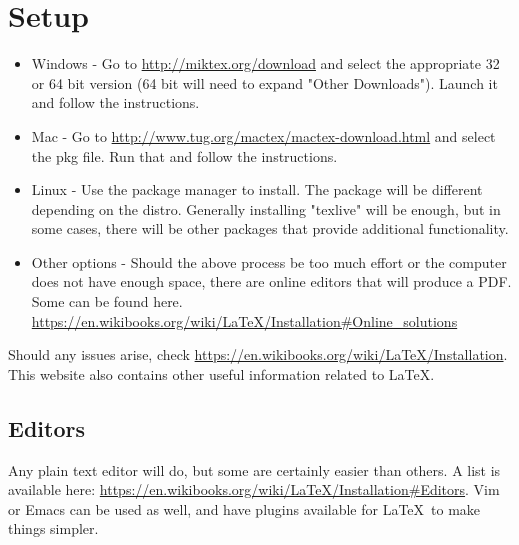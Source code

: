 \documentclass[11pt]{article}
\begin{document}
\section*{Setup}
\begin{itemize} 
    \item Windows - Go to \url{http://miktex.org/download} and select the appropriate 32 or 64 bit version (64 bit will need to expand "Other Downloads"). Launch it and follow the instructions.

    \item Mac - Go to \url{http://www.tug.org/mactex/mactex-download.html} and select the pkg file. Run that and follow the instructions. 

    \item Linux - Use the package manager to install. The package will be different depending on the distro. Generally installing "texlive" will be enough, but in some cases, there will be other packages that provide additional functionality. 

    \item Other options - Should the above process be too much effort or the computer does not have enough space, there are online editors that will produce a PDF. Some can be found here. \url{https://en.wikibooks.org/wiki/LaTeX/Installation#Online_solutions} 


\end{itemize}
        Should any issues arise, check \url{https://en.wikibooks.org/wiki/LaTeX/Installation}. This website also contains other useful information related to \LaTeX.

\subsection*{Editors}
Any plain text editor will do, but some are certainly easier than others. A list is available here: \url{https://en.wikibooks.org/wiki/LaTeX/Installation#Editors}. Vim or Emacs can be used as well, and have plugins available for \LaTeX\ to make things simpler.
\end{document}
